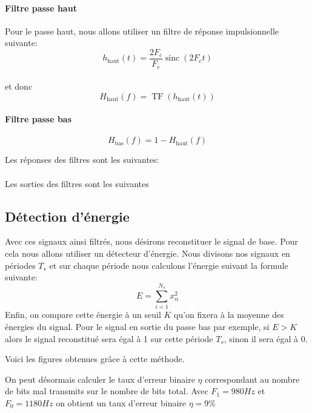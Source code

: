 \documentclass{article}
\newcommand{\TF}{\operatorname{TF}}
\newcommand{\sinc}{\operatorname{sinc}}
\begin{document}
\paragraph{Filtre passe haut}
Pour le passe haut, nous allons utiliser un filtre de réponse impulsionnelle suivante:
\[
h_\text{haut}(t) = \frac{2 F_c}{F_e} \sinc(2 F_c t)
\]
\\
et donc \[H_\text{haut}(f) = \TF(h_\text{haut}(t))
\]

\paragraph{Filtre passe bas}

\[
H_\text{bas}(f) = 1-H_\text{haut}(f)
\]

Les réponses des filtres sont les suivantes:



\paragraph{}



Les sorties des filtres sont les suivantes



\subsection{Détection d'énergie}


Avec ces signaux ainsi filtrés, nous désirons reconstituer le signal de base. Pour cela nous allons utiliser un détecteur d'énergie.
Nous divisons nos signaux en périodes $T_s$ et sur chaque période nous calculons l'énergie suivant la formule suivante:
\[
E=\sum_{i=1}^{N_s} x_n^2
\]
Enfin, on compare cette énergie à un seuil $K$ qu'on fixera à la moyenne des énergies du signal.
Pour le signal en sortie du passe bas par exemple, si $E>K$ alors le signal reconstitué sera égal à 1 sur cette période $T_s$, sinon il sera égal à 0.

Voici les figures obtenues grâce à cette méthode.




On peut désormais calculer le taux d'erreur binaire $\eta$ correspondant au nombre de bits mal transmits sur le nombre de bits total.
Avec $F_1=980Hz$ et $F_0=1180Hz$ on obtient un taux d'erreur binaire $\eta=9\%$
\end{document}
